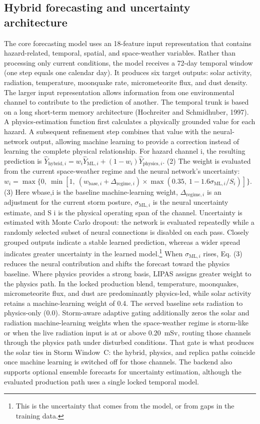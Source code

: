 \subsection{Hybrid forecasting and uncertainty architecture}

The core forecasting model uses an 18-feature input representation that contains hazard-related, temporal, spatial, and space-weather variables. Rather than processing only current conditions, the model receives a 72-day temporal window (one step equals one calendar day). It produces six target outputs: solar activity, radiation, temperature, moonquake rate, micrometeorite flux, and dust density. The larger input representation allows information from one environmental channel to contribute to the prediction of another. The temporal trunk is based on a long short-term memory architecture (Hochreiter and Schmidhuber, 1997). A physics-estimation function first calculates a physically grounded value for each hazard. A subsequent refinement step combines that value with the neural-network output, allowing machine learning to provide a correction instead of learning the complete physical relationship. For hazard channel i, the resulting prediction is $\hat{Y}_{\mathrm{hybrid},i} = w_i\hat{Y}_{\mathrm{ML},i} + (1-w_i)\hat{Y}_{\mathrm{physics},i}$. (2) The weight is evaluated from the current space-weather regime and the neural network's uncertainty: $w_i = \max\{0,\ \min[1,\ (w_{\mathrm{base},i}+\Delta_{\mathrm{regime},i})\times\max(0.35,\ 1-1.6\sigma_{\mathrm{ML},i}/S_i)]\}$. (3) Here wbase,i is the baseline machine-learning weight, $\Delta_{\mathrm{regime},i}$ is an adjustment for the current storm posture, $\sigma_{\mathrm{ML},i}$ is the neural uncertainty estimate, and S i is the physical operating span of the channel. Uncertainty is estimated with Monte Carlo dropout: the network is evaluated repeatedly while a randomly selected subset of neural connections is disabled on each pass. Closely grouped outputs indicate a stable learned prediction, whereas a wider spread indicates greater uncertainty in the learned model.\footnote{This is the uncertainty that comes from the model, or from gaps in the training data.} When $\sigma_{\mathrm{ML},i}$ rises, Eq. (3) reduces the neural contribution and shifts the forecast toward the physics baseline. Where physics provides a strong basis, LIPAS assigns greater weight to the physics path. In the locked production blend, temperature, moonquakes, micrometeorite flux, and dust are predominantly physics-led, while solar activity retains a machine-learning weight of 0.4. The served baseline sets radiation to physics-only (0.0). Storm-aware adaptive gating additionally zeros the solar and radiation machine-learning weights when the space-weather regime is storm-like or when the live radiation input is at or above 0.20~mSv, routing those channels through the physics path under disturbed conditions. That gate is what produces the solar ties in Storm Window~C: the hybrid, physics, and replica paths coincide once machine learning is switched off for those channels. The backend also supports optional ensemble forecasts for uncertainty estimation, although the evaluated production path uses a single locked temporal model.

